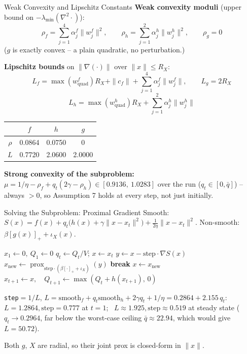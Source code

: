 \documentclass{beamer}
\begin{document}
\begin{frame}{Weak Convexity and Lipschitz Constants}
  \footnotesize
  \textbf{Weak convexity moduli} (upper bound on $-\lambda_{\min}(\nabla^2 \cdot)$):
  \[
    \rho_f = \sum_{j=1}^4 \alpha^f_j\|w^f_j\|^2, \qquad
    \rho_h = \sum_{j=1}^2 \alpha^h_j\|w^h_j\|^2, \qquad
    \rho_g = 0
  \]
  ($g$ is exactly convex -- a plain quadratic, no perturbation.)

  \textbf{Lipschitz bounds} on $\|\nabla(\cdot)\|$ over $\|x\| \le R_X$:
  \[
    L_f = \max(w^f_{\mathrm{quad}})R_X + \|c_f\| + \sum_{j=1}^4 \alpha^f_j\|w^f_j\|, \qquad L_g = 2R_X
  \]
  \[
    L_h = \max(w^h_{\mathrm{quad}})R_X + \sum_{j=1}^2 \alpha^h_j\|w^h_j\|
  \]

  \centering
  \begin{tabular}{c|ccc}
     & $f$ & $h$ & $g$ \\
    \hline
    $\rho$ & 0.0864 & 0.0750 & 0 \\
    $L$    & 0.7720 & 2.0600 & 2.0000 \\
  \end{tabular}

  \vspace{0.3em}
  \small
  \raggedright
  \textbf{Strong convexity of the subproblem:} $\mu = 1/\eta - \rho_f + q_t(2\gamma-\rho_h) \in [0.9136,\ 1.0283]$ over the run ($q_t \in [0,\bar q]$) -- always $>0$, so Assumption 7 holds at every step, not just initially.
\end{frame}

\begin{frame}{Solving the Subproblem: Proximal Gradient}
  \footnotesize
  Smooth: $S(x) = f(x) + q_t\big(h(x)+\gamma\|x-x_t\|^2\big) + \tfrac{1}{2\eta}\|x-x_t\|^2$. \quad
  Non-smooth: $\beta[g(x)]_+ + \iota_X(x)$.

  \begin{algorithmic}[1]
    \State $x_1 \gets 0,\ Q_1 \gets 0$
      \State $q_t \gets Q_t / V$; \quad $x \gets x_t$
        \State $y \gets x - \text{step}\cdot \nabla S(x)$ 
        \State $x_{\text{new}} \gets \operatorname{prox}_{\text{step}\cdot(\beta[\cdot]_+ + \iota_X)}(y)$ 
          \State \textbf{break}
        \EndIf
        \State $x \gets x_{\text{new}}$
      \EndFor
      \State $x_{t+1} \gets x,\quad Q_{t+1} \gets \max(Q_t + h(x_{t+1}),\, 0)$
    \EndFor
  \end{algorithmic}

  \texttt{step}$=1/L$, $L=\text{smooth}_f+q_t\text{smooth}_h+2\gamma q_t+1/\eta=0.2864+2.155\,q_t$: \ $L{=}1.2864,\text{step}{=}0.777$ at $t{=}1$; \ $L{\approx}1.925,\text{step}{\approx}0.519$ at steady state ($q_t{\to}0.2964$, far below the worst-case ceiling $\bar q{\approx}22.94$, which would give $L{=}50.72$).

  Both $g$, $X$ are radial, so their joint prox is closed-form in $\|x\|$.
\end{frame}
\end{document}
